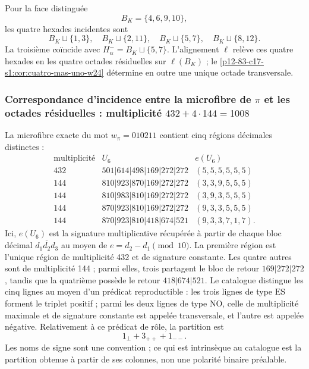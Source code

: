 Pour la face distinguée
\[
 B_K=\{4,6,9,10\},
\]
les quatre hexades incidentes sont
\[
 B_K\sqcup\{1,3\},\quad
 B_K\sqcup\{2,11\},\quad
 B_K\sqcup\{5,7\},\quad
 B_K\sqcup\{8,12\}.
\]
La troisième coïncide avec
\(H_\alpha^-=B_K\sqcup\{5,7\}\). L'alignement \(\ell\) relève ces
quatre hexades en les quatre octades résiduelles sur \(\ell(B_K)\) ; le
\cref{p12-83-c17-s1:cor:cuatro-mas-uno-w24} détermine en outre une unique octade transversale.

\subsubsection{Correspondance d'incidence entre la microfibre de \texorpdfstring{\(\pi\)}{pi} et les octades résiduelles : multiplicité \texorpdfstring{\(432+4\cdot144=1008\)}{432+4x144=1008}}

La microfibre exacte du mot
\(w_\pi=010211\) contient cinq régions décimales distinctes :
\[
\begin{array}{c|c|c}
\text{multiplicité}&U_6& e(U_6)\\
\hline
432&501|614|498|169|272|272&(5,5,5,5,5,5)\\
144&810|923|870|169|272|272&(3,3,9,5,5,5)\\
144&810|983|810|169|272|272&(3,9,3,5,5,5)\\
144&870|923|810|169|272|272&(9,3,3,5,5,5)\\
144&870|923|810|418|674|521&(9,3,3,7,1,7).
\end{array}
\]
Ici, \(e(U_6)\) est la signature multiplicative récupérée à partir de chaque bloc
décimal \(\overline{d_1d_2d_3}\) au moyen de
\(e=d_2-d_1\pmod {10}\). La première région est l'unique région de multiplicité
432 et de signature constante. Les quatre autres sont de multiplicité 144 ; parmi
elles, trois partagent le bloc de retour \(169|272|272\), tandis que la
quatrième possède le retour \(418|674|521\). Le catalogue distingue les cinq
lignes au moyen d'un prédicat reproductible : les trois lignes de type
\(\mathrm{ES}\) forment le triplet positif ; parmi les deux lignes de type
\(\mathrm{NO}\), celle de multiplicité maximale et de signature constante est appelée
transversale, et l'autre est appelée négative. Relativement à ce prédicat de
rôle, la partition est
\[
 \boxed{1_\perp+3_{++}+1_{--}.}
\]
Les noms de signe sont une convention ; ce qui est intrinsèque au catalogue est la
partition obtenue à partir de ses colonnes, non une polarité binaire préalable.

